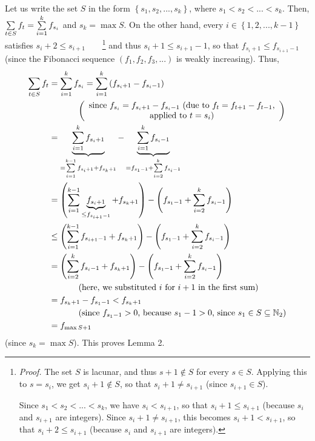 \documentclass[numbers=enddot,12pt,final,onecolumn,notitlepage]{scrartcl}%
\numberwithin{exer}{section}
\theoremstyle{definition}
\let\sumnonlimits\sum
\renewcommand{\sum}{\sumnonlimits\limits}
\begin{document}
Let us write the set $S$ in the form $\left\{  s_{1},s_{2},...,s_{k}\right\}
$, where $s_{1}<s_{2}<...<s_{k}$. Then, $\sum\limits_{t\in S}f_{t}%
=\sum\limits_{i=1}^{k}f_{s_{i}}$ and $s_{k}=\max S$. On the other hand, every
$i\in\left\{  1,2,...,k-1\right\}  $ satisfies $s_{i}+2\leq s_{i+1}%
$\ \ \ \ \footnote{\textit{Proof.} The set $S$ is lacunar, and thus $s+1\notin
S$ for every $s\in S$. Applying this to $s=s_{i}$, we get $s_{i}+1\notin S$,
so that $s_{i}+1\neq s_{i+1}$ (since $s_{i+1}\in S$).
\par
Since $s_{1}<s_{2}<...<s_{k}$, we have $s_{i}<s_{i+1}$, so that $s_{i}+1\leq
s_{i+1}$ (because $s_{i}$ and $s_{i+1}$ are integers). Since $s_{i}+1\neq
s_{i+1}$, this becomes $s_{i}+1<s_{i+1}$, so that $s_{i}+2\leq s_{i+1}$
(because $s_{i}$ and $s_{i+1}$ are integers).} and thus $s_{i}+1\leq
s_{i+1}-1$, so that $f_{s_{i}+1}\leq f_{s_{i+1}-1}$ (since the Fibonacci
sequence $\left(  f_{1},f_{2},f_{3},...\right)  $ is weakly increasing). Thus,%
\begin{align*}
\sum\limits_{t\in S}f_{t}  &  =\sum\limits_{i=1}^{k}f_{s_{i}}=\sum
\limits_{i=1}^{k}\left(  f_{s_{i}+1}-f_{s_{i}-1}\right) \\
&  \ \ \ \ \ \ \ \ \ \ \left(
\begin{array}
[c]{c}%
\text{since }f_{s_{i}}=f_{s_{i}+1}-f_{s_{i}-1}\text{ (due to }f_{t}%
=f_{t+1}-f_{t-1}\text{,}\\
\text{applied to }t=s_{i}\text{)}%
\end{array}
\right) \\
&  =\underbrace{\sum\limits_{i=1}^{k}f_{s_{i}+1}}_{=\sum\limits_{i=1}%
^{k-1}f_{s_{i}+1}+f_{s_{k}+1}}-\underbrace{\sum\limits_{i=1}^{k}f_{s_{i}-1}%
}_{=f_{s_{1}-1}+\sum\limits_{i=2}^{k}f_{s_{i}-1}}\\
&  =\left(  \sum\limits_{i=1}^{k-1}\underbrace{f_{s_{i}+1}}_{\leq
f_{s_{i+1}-1}}+f_{s_{k}+1}\right)  -\left(  f_{s_{1}-1}+\sum\limits_{i=2}%
^{k}f_{s_{i}-1}\right) \\
&  \leq\left(  \sum\limits_{i=1}^{k-1}f_{s_{i+1}-1}+f_{s_{k}+1}\right)
-\left(  f_{s_{1}-1}+\sum\limits_{i=2}^{k}f_{s_{i}-1}\right) \\
&  =\left(  \sum\limits_{i=2}^{k}f_{s_{i}-1}+f_{s_{k}+1}\right)  -\left(
f_{s_{1}-1}+\sum\limits_{i=2}^{k}f_{s_{i}-1}\right) \\
&  \ \ \ \ \ \ \ \ \ \ \left(  \text{here, we substituted }i\text{ for
}i+1\text{ in the first sum}\right) \\
&  =f_{s_{k}+1}-f_{s_{1}-1}<f_{s_{k}+1}\\
&  \ \ \ \ \ \ \ \ \ \ \left(  \text{since }f_{s_{1}-1}>0\text{, because
}s_{1}-1>0\text{, since }s_{1}\in S\subseteq\mathbb{N}_{2}\right) \\
&  =f_{\max S+1}%
\end{align*}
(since $s_{k}=\max S$). This proves Lemma 2.
\end{document}
